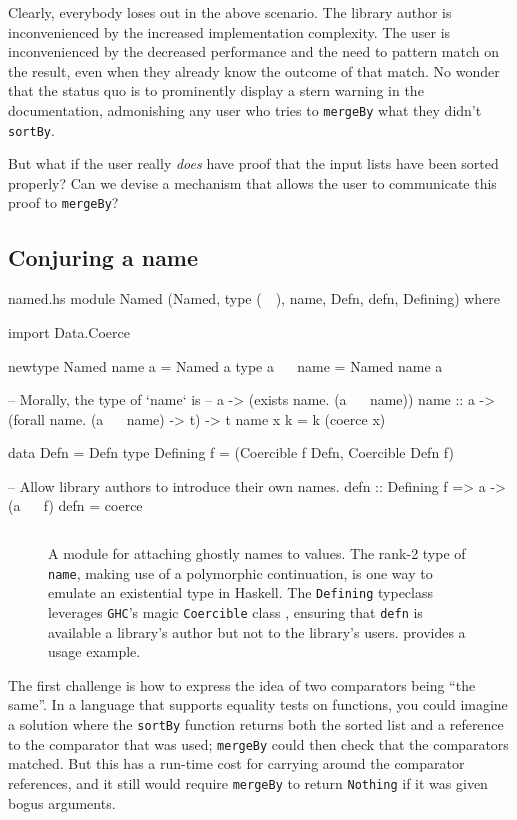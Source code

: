 \documentclass[format=sigplan, review=false, screen=true]{acmart}
\begin{document}
Clearly, everybody loses out in the above scenario. The
library author is inconvenienced by the increased implementation complexity.
The user is inconvenienced by the decreased performance and the need to
pattern match on the result, even when they  already know the
outcome of that match. No wonder that the status quo is to prominently display
a stern warning in the documentation, admonishing
any user who tries to \texttt{mergeBy} what they didn't \texttt{sortBy}.

But what if the user really \emph{does} have proof that the input lists have
been sorted properly? Can we devise a mechanism that allows the user to communicate
this proof to \texttt{mergeBy}?

\subsection{Conjuring a name}

\begin{filecontents*}{named.hs}
module Named
  (Named, type (~~), name, Defn, defn, Defining) where

import Data.Coerce

newtype Named name a = Named a
type a ~~ name = Named name a

-- Morally, the type of `name` is
--      a -> (exists name. (a ~~ name))
name :: a -> (forall name. (a ~~ name) -> t) -> t
name x k = k (coerce x)

data Defn = Defn
type Defining f = (Coercible f Defn, Coercible Defn f)

-- Allow library authors to introduce their own names.
defn :: Defining f => a -> (a ~~ f)
defn = coerce
\end{filecontents*}
\begin{figure}[b]
  \inputminted{haskell}{named.hs}
  \caption{A module for attaching ghostly names to values. The rank-2 type of \texttt{name},
    making use of a polymorphic continuation, is one way to emulate an existential type in
    Haskell. The \texttt{Defining} typeclass
    leverages \texttt{GHC}'s magic \texttt{Coercible} class \cite{Breitner:2014:SZC:2692915.2628141},
    ensuring that \texttt{defn} is available a library's author but not
    to the library's users.  provides a usage example.\label{name-module}}
\end{figure}


The first challenge is how to express the idea of two  comparators
being ``the same''. In a language that supports equality tests on functions,
you could imagine a solution where the \texttt{sortBy} function returns both the sorted
list and a reference to the comparator that was used; \texttt{mergeBy} could
then check that the comparators matched. But this has a run-time cost for carrying
around the comparator references, and it still would require \texttt{mergeBy} to
return \texttt{Nothing} if it was given bogus arguments.
\end{document}
